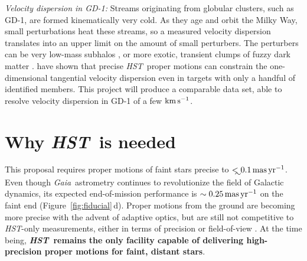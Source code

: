 \documentclass[12pt]{article}
\newcommand{\hst}{\textsl{HST}}
\newcommand{\gaia}{\textsl{Gaia}}
\begin{document}
\emph{Velocity dispersion in GD-1:}
Streams originating from globular clusters, such as GD-1, are formed kinematically very cold.
As they age and orbit the Milky Way, small perturbations heat these streams, so a measured velocity dispersion translates into an upper limit on the amount of small perturbers.
The perturbers can be very low-mass subhalos \parencite[e.g.,][]{yoon2011}, or more exotic, transient clumps of fuzzy dark matter \parencite[e.g.,][]{amorisco2018}.
\textcite{sohn2016} have shown that precise \hst\ proper motions can constrain the one-dimensional tangential velocity dispersion even in targets with only a handful of identified members.
This project will produce a comparable data set, able to resolve velocity dispersion in GD-1 of a few $\rm km\,s^{-1}$.


\section*{Why \hst\ is needed}
This proposal requires proper motions of faint stars precise to $\lesssim0.1\,\rm mas\, yr^{-1}$.
Even though \gaia\ astrometry continues to revolutionize the field of Galactic dynamics, its expected end-of-mission performance is $\sim0.25\,\rm mas\,yr^{-1}$ on the faint end (Figure~\ref{fig:fiducial}\,d).
Proper motions from the ground are becoming more precise with the advent of adaptive optics, but are still not competitive to \hst-only measurements, either in terms of precision or field-of-view \parencite{fritz2017}.
At the time being, {\bf \hst\ remains the only facility capable of delivering high-precision proper motions for faint, distant stars}.


%
%
\describeobservations   %
\vspace{-0.5cm}
\end{document}
